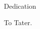 \chapter[Dedication]{\label{Dedication}}

\begin{center}
  {\Huge Dedication\par}
  \vspace{1cm}
  {To Tater.}
\end{center}